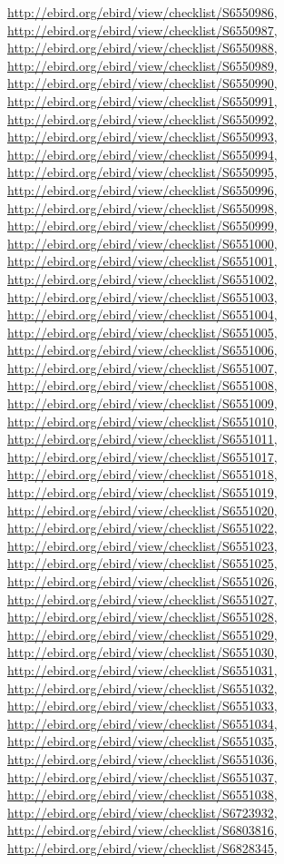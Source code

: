 \documentclass[9pt, article]{memoir}
\begin{document}
\begin{multicols}{2}
\url{http://ebird.org/ebird/view/checklist/S6550986}, 
\url{http://ebird.org/ebird/view/checklist/S6550987}, 
\url{http://ebird.org/ebird/view/checklist/S6550988}, 
\url{http://ebird.org/ebird/view/checklist/S6550989}, 
\url{http://ebird.org/ebird/view/checklist/S6550990}, 
\url{http://ebird.org/ebird/view/checklist/S6550991}, 
\url{http://ebird.org/ebird/view/checklist/S6550992}, 
\url{http://ebird.org/ebird/view/checklist/S6550993}, 
\url{http://ebird.org/ebird/view/checklist/S6550994}, 
\url{http://ebird.org/ebird/view/checklist/S6550995}, 
\url{http://ebird.org/ebird/view/checklist/S6550996}, 
\url{http://ebird.org/ebird/view/checklist/S6550998}, 
\url{http://ebird.org/ebird/view/checklist/S6550999}, 
\url{http://ebird.org/ebird/view/checklist/S6551000}, 
\url{http://ebird.org/ebird/view/checklist/S6551001}, 
\url{http://ebird.org/ebird/view/checklist/S6551002}, 
\url{http://ebird.org/ebird/view/checklist/S6551003}, 
\url{http://ebird.org/ebird/view/checklist/S6551004}, 
\url{http://ebird.org/ebird/view/checklist/S6551005}, 
\url{http://ebird.org/ebird/view/checklist/S6551006}, 
\url{http://ebird.org/ebird/view/checklist/S6551007}, 
\url{http://ebird.org/ebird/view/checklist/S6551008}, 
\url{http://ebird.org/ebird/view/checklist/S6551009}, 
\url{http://ebird.org/ebird/view/checklist/S6551010}, 
\url{http://ebird.org/ebird/view/checklist/S6551011}, 
\url{http://ebird.org/ebird/view/checklist/S6551017}, 
\url{http://ebird.org/ebird/view/checklist/S6551018}, 
\url{http://ebird.org/ebird/view/checklist/S6551019}, 
\url{http://ebird.org/ebird/view/checklist/S6551020}, 
\url{http://ebird.org/ebird/view/checklist/S6551022}, 
\url{http://ebird.org/ebird/view/checklist/S6551023}, 
\url{http://ebird.org/ebird/view/checklist/S6551025}, 
\url{http://ebird.org/ebird/view/checklist/S6551026}, 
\url{http://ebird.org/ebird/view/checklist/S6551027}, 
\url{http://ebird.org/ebird/view/checklist/S6551028}, 
\url{http://ebird.org/ebird/view/checklist/S6551029}, 
\url{http://ebird.org/ebird/view/checklist/S6551030}, 
\url{http://ebird.org/ebird/view/checklist/S6551031}, 
\url{http://ebird.org/ebird/view/checklist/S6551032}, 
\url{http://ebird.org/ebird/view/checklist/S6551033}, 
\url{http://ebird.org/ebird/view/checklist/S6551034}, 
\url{http://ebird.org/ebird/view/checklist/S6551035}, 
\url{http://ebird.org/ebird/view/checklist/S6551036}, 
\url{http://ebird.org/ebird/view/checklist/S6551037}, 
\url{http://ebird.org/ebird/view/checklist/S6551038}, 
\url{http://ebird.org/ebird/view/checklist/S6723932}, 
\url{http://ebird.org/ebird/view/checklist/S6803816}, 
\url{http://ebird.org/ebird/view/checklist/S6828345}, 

\end{multicols}
\end{document}
